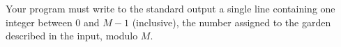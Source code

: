 Your program must write to the standard output a single line containing one integer between $0$ and $M - 1$ (inclusive), the number assigned to the garden described in the input, modulo $M$.